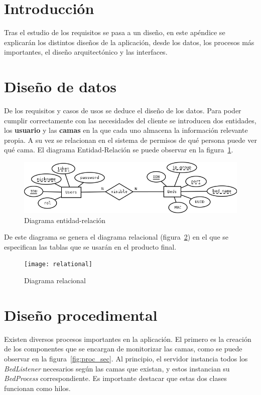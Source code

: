 
\section{Introducción}

Tras el estudio de los requisitos se pasa a un diseño, en este apéndice se explicarán los distintos diseños de la aplicación, desde los datos, los procesos más importantes, el diseño arquitectónico y las interfaces.

\section{Diseño de datos}

De los requisitos y casos de usos se deduce el diseño de los datos. Para poder cumplir correctamente con las necesidades del cliente se introducen dos entidades, los \textbf{usuario} y las \textbf{camas} en la que cada uno almacena la información relevante propia. A su vez se relacionan en el sistema de permisos de qué persona puede ver qué cama. El diagrama Entidad-Relación se puede observar en la figura~\ref{fig:erDia}.

\begin{figure}
	\centering
	\includegraphics[width=\textwidth]{img/entidad-relacion.png}
	\caption{Diagrama entidad-relación}
	\label{fig:erDia}
\end{figure}

De este diagrama se genera el diagrama relacional (figura~\ref{fig:relational}) en el que se especifican las tablas que se usarán en el producto final.

\begin{figure}
	\centering
	\texttt{[image: relational]}
	\caption{Diagrama relacional}
	\label{fig:relational}
\end{figure}


\section{Diseño procedimental}\label{sec:disproc}

Existen diversos procesos importantes en la aplicación. El primero es la creación de los componentes que se encargan de monitorizar las camas, como se puede observar en la figura~\ref{fig:proc_sec}. Al principio, el servidor instancia todos los \textit{BedListener} necesarios según las camas que existan, y estos instancian su \textit{BedProcess} correspondiente. Es importante destacar que estas dos clases funcionan como hilos. 

